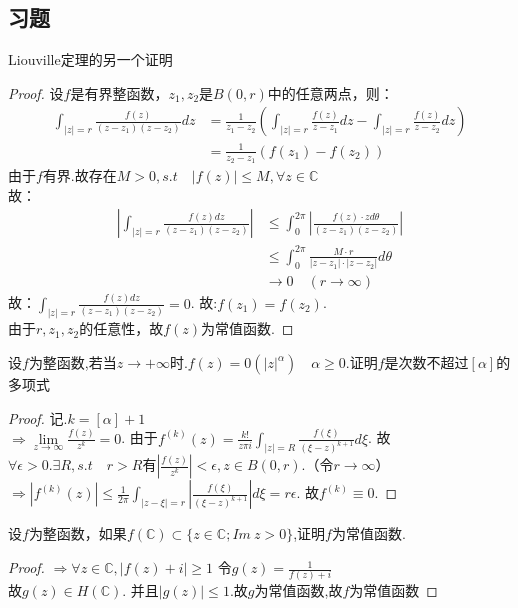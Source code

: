 \subsection*{习题}
\begin{eg}
	{\rm Liouville}定理的另一个证明
\end{eg}
\begin{proof}
	设$f$是有界整函数，$z_{1},z_{2}$是$B(0,r)$中的任意两点，则：
	\begin{align*}
	\int_{|z|=r}\frac{f(z)}{(z-z_1)(z-z_2)}dz
	&=\frac{1}{z_1-z_2}
	\left(\int_{|z|=r}\frac{f(z)}{z-z_1}dz-\int_{|z|=r}\frac{f(z)}{z-z_2}dz\right)\\
	&=\frac{1}{z_2-z_1}\left(f(z_1)-f(z_2)\right)
	\end{align*}
	由于$f$有界.故存在$M>0,s.t\quad|f(z)|\leq M,\forall z\in \mathbb{C}$\\
	故：
	\begin{align*}
	\left|\int_{|z|=r}\frac{f(z)dz}{(z-z_1)(z-z_2)}\right|
	&\leq\int_0^{2\pi}\left|\frac{f(z)\cdot zd\theta}{(z-z_1)(z-z_2)}\right|\\
	&\leq\int_0^{2\pi}\frac{M\cdot r}{|z-z_1|\cdot|z-z_2|}d\theta\\
	&\rightarrow 0\quad(r\rightarrow\infty)
	\end{align*}
	故：$\displaystyle{\int_{|z|=r}\frac{f(z)dz}{(z-z_1)(z-z_2)}=0}$. \quad 故:$\displaystyle{f(z_1)=f(z_2)}$.\\
	由于$r,z_1,z_2$的任意性，故$f(z)$为常值函数.
\end{proof}

\begin{eg}
	设$f$为整函数,若当$z\rightarrow+\infty$时.$f(z)=0(|z|^\alpha)\quad\alpha\geq0$.证明$f$是次数不超过$[\alpha]$的多项式
\end{eg}
\begin{proof}
	记.$k=[\alpha]+1$\\
	$\displaystyle{\Rightarrow\lim\limits_{z\to\infty}\frac{f(z)}{z^k}=0}$.
	由于$\displaystyle{f^{(k)}(z)=\frac{k!}{z\pi i}\int_{|z|=R}\frac{f(\xi)}{(\xi-z)^{k+1}}d\xi}$.
	故$\forall\epsilon>0.\exists R, s.t\quad r>R$有$\displaystyle{\left|\frac{f(z)}{z^k}\right|<\epsilon,z\in B(0,r)}$.（令$r\rightarrow\infty$）\\
	$\displaystyle{\Rightarrow\left|f^{(k)}(z)\right|\leq\frac{1}{2\pi}\int_{|z-\xi|=r}\left|\frac{f(\xi)}{(\xi-z)^{k+1}}\right|d\xi=r\epsilon}$.
	故$f^{(k)}\equiv0$.
\end{proof}

\begin{eg}
	设$f$为整函数，如果$f(\mathbb{C})\subset\{z\in\mathbb{C};I\!m\ z>0\}$,证明$f$为常值函数.
\end{eg}
\begin{proof}
	$\Rightarrow \forall z\in \mathbb{C}, |f(z)+i|\geq 1$ \quad 令$\displaystyle{g(z)=\frac{1}{f(z)+i}}$\\
	故$g(z)\in H(\mathbb{C})$. 并且\quad$|g(z)|\leq1$.故$g$为常值函数,故$f$为常值函数
\end{proof}

